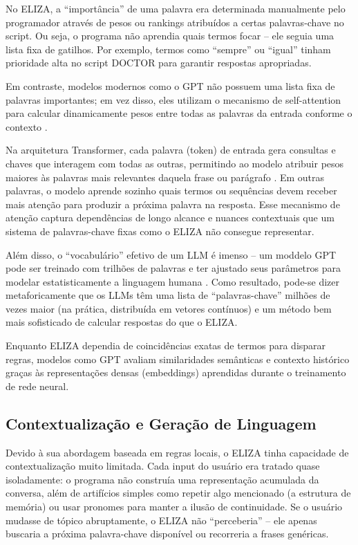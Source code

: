 \documentclass[14pt,a4paper,oneside]{book}
\begin{document}
No ELIZA, a “importância” de uma palavra era determinada manualmente pelo programador através de pesos ou rankings atribuídos a certas palavras-chave no script. Ou seja, o programa não aprendia quais termos focar – ele seguia uma lista fixa de gatilhos. Por exemplo, termos como “sempre” ou “igual” tinham prioridade alta no script DOCTOR para garantir respostas apropriadas.

Em contraste, modelos modernos como o GPT não possuem uma lista fixa de palavras importantes; em vez disso, eles utilizam o mecanismo de self-attention para calcular dinamicamente pesos entre todas as palavras da entrada conforme o contexto \cite{Vaswani2017}.

Na arquitetura Transformer, cada palavra (token) de entrada gera consultas e chaves que interagem com todas as outras, permitindo ao modelo atribuir pesos maiores às palavras mais relevantes daquela frase ou parágrafo \cite{Vaswani2017}. Em outras palavras, o modelo aprende sozinho quais termos ou sequências devem receber mais atenção para produzir a próxima palavra na resposta. Esse mecanismo de atenção captura dependências de longo alcance e nuances contextuais que um sistema de palavras-chave fixas como o ELIZA não consegue representar.

Além disso, o “vocabulário” efetivo de um LLM é imenso – um moddelo GPT pode ser treinado com trilhões de palavras e ter ajustado seus parâmetros para modelar estatisticamente a linguagem humana \cite{Vaswani2017}. Como resultado, pode-se dizer metaforicamente que os LLMs têm uma lista de “palavras-chave” milhões de vezes maior (na prática, distribuída em vetores contínuos) e um método bem mais sofisticado de calcular respostas do que o ELIZA.

Enquanto ELIZA dependia de coincidências exatas de termos para disparar regras, modelos como GPT avaliam similaridades semânticas e contexto histórico graças às representações densas (embeddings) aprendidas durante o treinamento de rede neural.

\subsection{Contextualização e Geração de Linguagem}

Devido à sua abordagem baseada em regras locais, o ELIZA tinha capacidade de contextualização muito limitada. Cada input do usuário era tratado quase isoladamente: o programa não construía uma representação acumulada da conversa, além de artifícios simples como repetir algo mencionado (a estrutura de memória) ou usar pronomes para manter a ilusão de continuidade. Se o usuário mudasse de tópico abruptamente, o ELIZA não “perceberia” – ele apenas buscaria a próxima palavra-chave disponível ou recorreria a frases genéricas.
\end{document}
